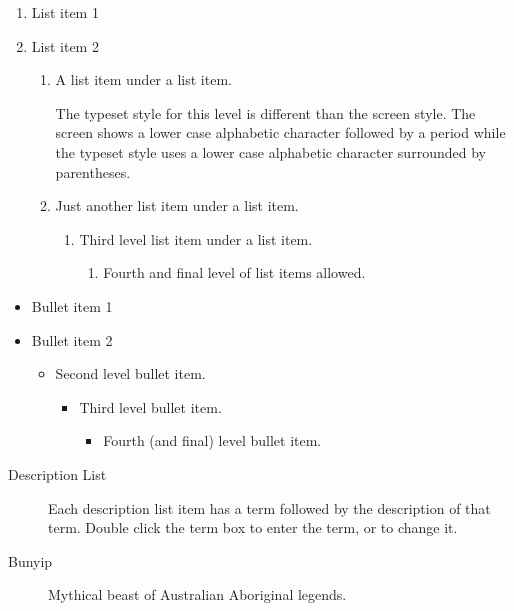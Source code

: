 \documentclass{amsbook}
\theoremstyle{plain}
\numberwithin{equation}{chapter}
\begin{document}
\begin{enumerate}
\item List item 1

\item List item 2

\begin{enumerate}
\item A list item under a list item.

The typeset style for this level is different than the screen style. The
screen shows a lower case alphabetic character followed by a period while
the typeset style uses a lower case alphabetic character surrounded by
parentheses.

\item Just another list item under a list item.

\begin{enumerate}
\item Third level list item under a list item.

\begin{enumerate}
\item Fourth and final level of list items allowed.
\end{enumerate}
\end{enumerate}
\end{enumerate}
\end{enumerate}

\begin{itemize}
\item Bullet item 1

\item Bullet item 2

\begin{itemize}
\item Second level bullet item.

\begin{itemize}
\item Third level bullet item.

\begin{itemize}
\item Fourth (and final) level bullet item.
\end{itemize}
\end{itemize}
\end{itemize}
\end{itemize}

\begin{description}
\item[Description List] Each description list item has a term followed by
the description of that term. Double click the term box to enter the term,
or to change it.

\item[Bunyip] Mythical beast of Australian Aboriginal legends.
\end{description}
\end{document}

